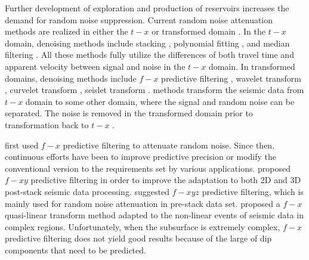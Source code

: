 Further development of exploration and production of reservoirs increases the demand
for random noise suppression.
Current random noise attenuation methods are realized in either the $t-x$ or transformed domain \cite[]{zhipeng}. In the
 $t-x$ domain, denoising methods include stacking \cite[]{mayne,yilmaz,guochang}, polynomial fitting \cite[]{zhong,guochang1}, and median filtering \cite[]{Liu}. All these methods fully utilize the differences of both travel time and apparent velocity between signal and noise in the $t-x$ domain. In transformed domains, denoising methods include $f-x$ predictive filtering \cite[]{canales},  wavelet transform \cite[]{Zhang,gao},  curvelet transform \cite[]{neelamani},  seislet transform \cite[]{yang,seislet}.  methods transform the seismic data from  $t-x$ domain to some other domain, where the signal and random noise can be separated. The noise is removed in the transformed domain prior to transformation back to  $t-x$ .

\cite{canales} first used $f-x$ predictive filtering to attenuate random noise. Since then, continuous efforts have been  to improve  predictive precision or  modify the conventional version to     the requirements set by various applications. \cite{guo} proposed $f-xy$ predictive filtering in order to  improve the adaptation to both 2D and 3D post-stack seismic data processing. \cite{su} suggested $f-xyz$ predictive filtering, which is mainly used for random noise attenuation in  pre-stack data set. 
\cite{kang} proposed a $f-x$ quasi-linear transform method  adapted to the non-linear events of seismic data in complex regions. Unfortunately, when the subsurface is extremely complex, $f-x$ predictive filtering does not yield good  results because of the large  of dip components that need to be predicted.


